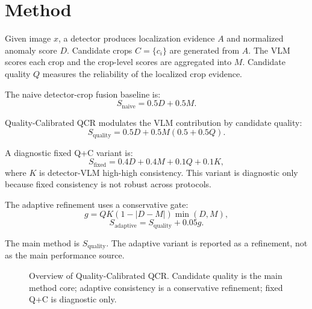 \documentclass[10pt]{article}
\begin{document}
\section{Method}

Given image $x$, a detector produces localization evidence $A$ and normalized anomaly score $D$.
Candidate crops $C=\{c_i\}$ are generated from $A$.
The VLM scores each crop and the crop-level scores are aggregated into $M$.
Candidate quality $Q$ measures the reliability of the localized crop evidence.

The naive detector-crop fusion baseline is:
\begin{equation}
S_{\mathrm{naive}} = 0.5D + 0.5M.
\end{equation}

Quality-Calibrated QCR modulates the VLM contribution by candidate quality:
\begin{equation}
S_{\mathrm{quality}} = 0.5D + 0.5M(0.5 + 0.5Q).
\end{equation}

A diagnostic fixed Q+C variant is:
\begin{equation}
S_{\mathrm{fixed}} = 0.4D + 0.4M + 0.1Q + 0.1K,
\end{equation}
where $K$ is detector-VLM high-high consistency.
This variant is diagnostic only because fixed consistency is not robust across protocols.

The adaptive refinement uses a conservative gate:
\begin{equation}
g = QK(1-|D-M|)\min(D,M),
\end{equation}
\begin{equation}
S_{\mathrm{adaptive}} = S_{\mathrm{quality}} + 0.05g.
\end{equation}

The main method is $S_{\mathrm{quality}}$.
The adaptive variant is reported as a refinement, not as the main performance source.

\begin{figure}[t]
\centering
{}
\caption{Overview of Quality-Calibrated QCR. Candidate quality is the main method core; adaptive consistency is a conservative refinement; fixed Q+C is diagnostic only.}
\label{fig:framework}
\end{figure}
\end{document}
